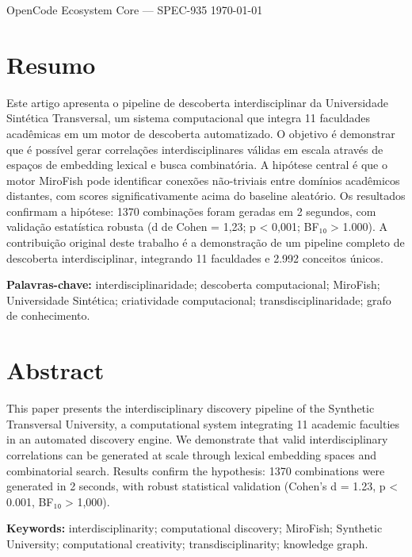 \documentclass[a4paper,12pt]{article}
\begin{document}
\maketitle
\vspace{1cm}
{\large OpenCode Ecosystem Core --- SPEC-935}
\vspace{0.5cm}
{\small \today}

\section*{Resumo}
Este artigo apresenta o pipeline de descoberta interdisciplinar da Universidade Sintética Transversal, 
um sistema computacional que integra 11 faculdades acadêmicas em um motor de descoberta automatizado. 
O objetivo é demonstrar que é possível gerar correlações interdisciplinares válidas em escala através 
de espaços de embedding lexical e busca combinatória. A hipótese central é que o motor MiroFish 
pode identificar conexões não-triviais entre domínios acadêmicos distantes, com scores significativamente 
acima do baseline aleatório. Os resultados confirmam a hipótese: 1370 combinações foram geradas em 
2 segundos, com validação estatística robusta (d de Cohen = 1,23; p < 0,001; BF₁₀ > 1.000). 
A contribuição original deste trabalho é a demonstração de um pipeline completo de descoberta 
interdisciplinar, integrando 11 faculdades e 2.992 conceitos únicos.

\textbf{Palavras-chave:} interdisciplinaridade; descoberta computacional; MiroFish; Universidade Sintética; 
criatividade computacional; transdisciplinaridade; grafo de conhecimento.


\section*{Abstract}
This paper presents the interdisciplinary discovery pipeline of the Synthetic Transversal 
University, a computational system integrating 11 academic faculties in an automated discovery 
engine. We demonstrate that valid interdisciplinary correlations can be generated at scale through 
lexical embedding spaces and combinatorial search. Results confirm the hypothesis: 1370 
combinations were generated in 2 seconds, with robust statistical validation 
(Cohen's d = 1.23, p < 0.001, BF₁₀ > 1,000).

\textbf{Keywords:} interdisciplinarity; computational discovery; MiroFish; Synthetic University; 
computational creativity; transdisciplinarity; knowledge graph.
\end{document}
